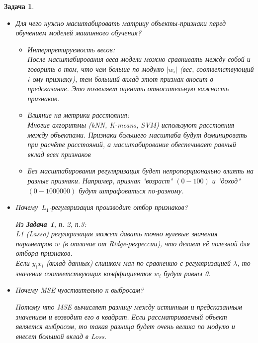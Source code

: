 \documentclass[a4paper,12pt]{article}
\theoremstyle{mystyle}
\newtheorem{esProblem}{Задача}
\begin{document}
\begin{esProblem}
\begin{itemize}
        \item Для чего нужно масштабировать матрицу объекты-признаки перед обучением моделей машинного обучения?
        \begin{itemize}
        \item Интерпретируемость весов: \\
        После масштабирования веса модели можно сравнивать между собой и говорить о том, что чем больше по модулю $|w_i|$ (вес, соответствующий $i$-ому признаку), тем больший вклад этот признак вносит в предсказание. Это позволяет оценить относительную важность признаков.
        \item Влияние на метрики расстояния: \\
        Многие алгоритмы (kNN, K-means, SVM) используют расстояния между объектами. Признаки большего масштаба будут доминировать при расчёте расстояний, а масштабирование обеспечивает равный вклад всех признаков
        \item Без масштабирования регуляризация будет непропорционально влиять на разные признаки. Например, признак "возраст" $(0-100)$ и "доход" $(0-1000000)$ будут штрафоваться по-разному.
        \end{itemize}
        
        \item Почему~$L_1$-регуляризация производит отбор признаков?
      
        Из \textbf{Задача 1}, п. 2, п.3: \\
         L1 (Lasso) регуляризация может давать точно нулевые значения параметров $w$ (в отличие от Ridge-регрессии), что делает её полезной для отбора признаков. \\
Если $y_i x_i$ (вклад данных) слишком мал по сравнению с регуляризацией $\lambda$, то значения соответствующих коэффициентов $w_i$ будут равны 0.
        \item Почему MSE чувствительно к выбросам? 
        
        Потому что MSE вычисляет разницу между истинным и предсказанным значением и возводит его в квадрат. Если рассматриваемый объект является выбросом, то такая разница будет очень велика по модулю и внесет большой вклад в Loss. 
    \end{itemize}
\end{esProblem}
\end{document}
